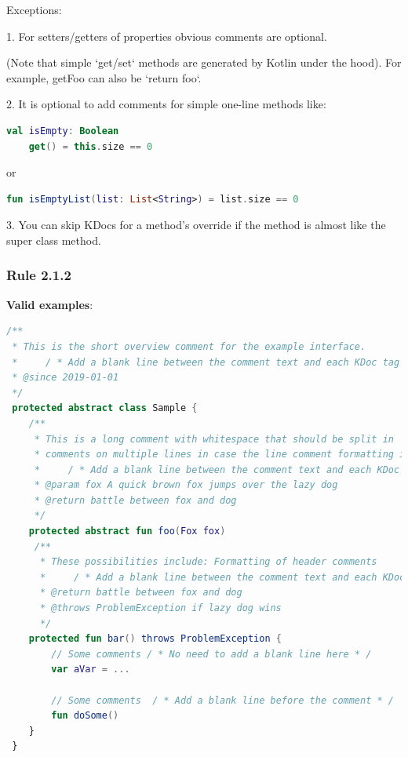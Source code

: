 Exceptions:



1. For setters/getters of properties obvious comments are optional.

 (Note that simple `get/set` methods are generated by Kotlin under the hood). For example, getFoo can also be `return foo`.



2. It is optional to add comments for simple one-line methods like:

\begin{lstlisting}[language=Kotlin]
val isEmpty: Boolean
    get() = this.size == 0
\end{lstlisting}


or



\begin{lstlisting}[language=Kotlin]
fun isEmptyList(list: List<String>) = list.size == 0
\end{lstlisting}


3. You can skip KDocs for a method's override if the method is almost like the super class method.



\subsubsection*{\textbf{Rule 2.1.2}}
\leavevmode\newline



\textbf{Valid examples}:



\begin{lstlisting}[language=Kotlin]
/**
 * This is the short overview comment for the example interface.
 *     / * Add a blank line between the comment text and each KDoc tag underneath * /
 * @since 2019-01-01
 */
 protected abstract class Sample {
    /**
     * This is a long comment with whitespace that should be split in
     * comments on multiple lines in case the line comment formatting is enabled.
     *     / * Add a blank line between the comment text and each KDoc tag underneath * /
     * @param fox A quick brown fox jumps over the lazy dog
     * @return battle between fox and dog
     */
    protected abstract fun foo(Fox fox)
     /**
      * These possibilities include: Formatting of header comments
      *     / * Add a blank line between the comment text and each KDoc tag underneath * /
      * @return battle between fox and dog
      * @throws ProblemException if lazy dog wins
      */
    protected fun bar() throws ProblemException {
        // Some comments / * No need to add a blank line here * /
        var aVar = ...

        // Some comments  / * Add a blank line before the comment * /
        fun doSome()
    }
 }
\end{lstlisting}


